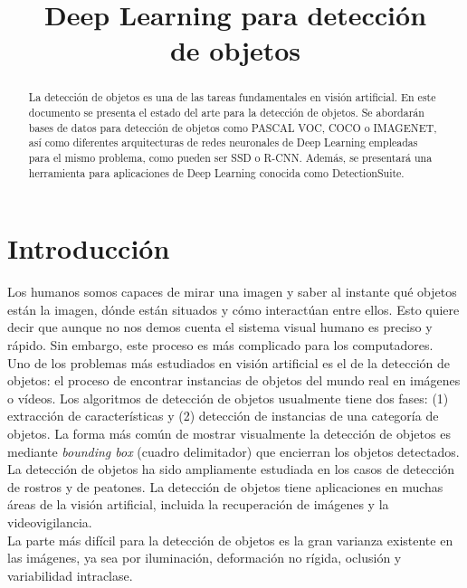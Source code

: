 \documentclass{bmvc2k}
\title{Deep Learning para detección\\ de objetos}
\begin{document}
\maketitle

\begin{abstract}
La detección de objetos es una de las tareas fundamentales en visión artificial. En este documento se presenta el estado del arte para la detección de objetos. Se abordarán bases de datos para detección de objetos como PASCAL VOC, COCO o IMAGENET, así como diferentes arquitecturas de redes neuronales de Deep Learning empleadas para el mismo problema, como pueden ser SSD o R-CNN. Además, se presentará una herramienta para aplicaciones de Deep Learning conocida como DetectionSuite.

\end{abstract}

\section{Introducción}
\label{sec:intro}
Los humanos somos capaces de mirar una imagen y saber al instante qué objetos están la imagen, dónde están situados y cómo interactúan entre ellos. Esto quiere decir que aunque no nos demos cuenta el sistema visual humano es preciso y rápido. Sin embargo, este proceso es más complicado para los computadores.\\

Uno de los problemas más estudiados en visión artificial es el de la detección de objetos: el proceso de encontrar instancias de objetos del mundo real en imágenes o vídeos. Los algoritmos de detección de objetos usualmente tiene dos fases: (1) extracción de características y (2) detección de instancias de una categoría de objetos. La forma más común de mostrar visualmente la detección de objetos es mediante \textit{bounding box} (cuadro delimitador) que encierran los objetos detectados.\\

La detección de objetos ha sido ampliamente estudiada en los casos de detección de rostros y de peatones. La detección de objetos tiene aplicaciones en muchas áreas de la visión artificial, incluida la recuperación de imágenes y la videovigilancia.\\

La parte más difícil para la detección de objetos es la gran varianza existente en las imágenes, ya sea por iluminación, deformación no rígida, oclusión y variabilidad intraclase.\\
\end{document}
